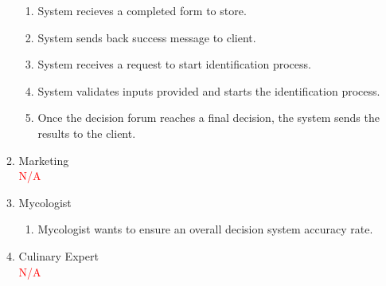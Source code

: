 \documentclass[]{article}
\begin{document}
\begin{enumerate}[{\bf BE1.}]
\begin{enumerate}[{\bf VP1.}]
\begin{enumerate}[1.]
					\item System recieves a completed form to store.
					\item System sends back success message to client.
					\item System receives a request to start identification process.
					\item System validates inputs provided and starts the identification process.
					\item Once the decision forum reaches a final decision, the system sends the results to the client.
				\end{enumerate}
			\item Marketing\\
				\textcolor{red}{N/A}
			\item Mycologist\\
				\begin{enumerate}[1.]
					\item Mycologist wants to ensure an overall decision system accuracy rate.
				\end{enumerate}
			\item Culinary Expert\\
				\textcolor{red}{N/A}
		\end{enumerate}
		

\end{enumerate}
\end{document}
